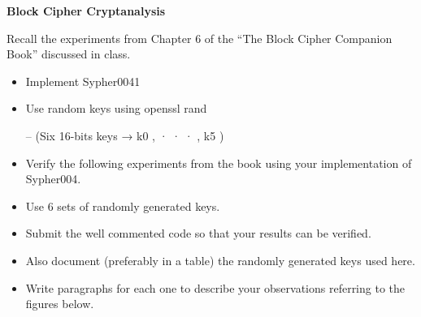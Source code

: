 \documentclass[10pt, a4paper]{article}
\begin{document}
\newpage
\begin{Problem}

\textbf{Block Cipher Cryptanalysis}

Recall the experiments from Chapter 6 of the “The Block Cipher Companion Book” discussed
in class.
\begin{itemize}
\item Implement Sypher0041
\item Use random keys using openssl rand

      – (Six 16-bits keys → k0 , · · · , k5 )
\item Verify the following experiments from the book using your implementation of Sypher004.
\item Use 6 sets of randomly generated keys.
\item Submit the well commented code so that your results can be verified.
\item Also document (preferably in a table) the randomly generated keys used here.
\item Write paragraphs for each one to describe your observations referring to the figures below.


\end{itemize}
\end{Problem}
\end{document}

